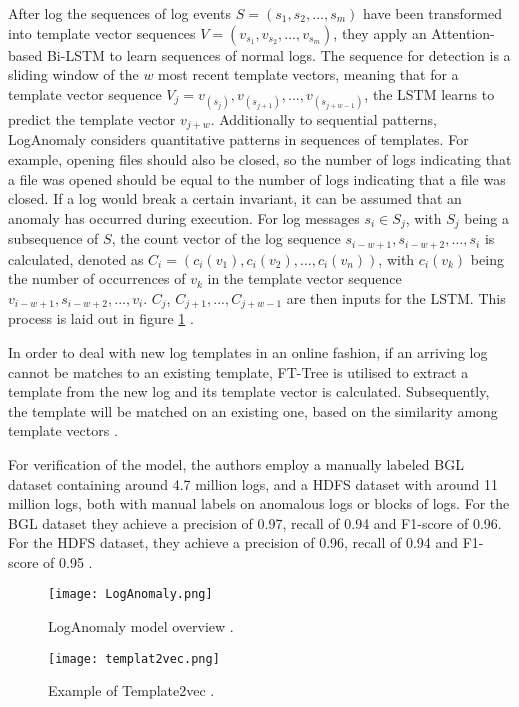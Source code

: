 After log the sequences of log events $S=(s_1, s_2,...,s_m)$ have been transformed into template vector sequences $V=(v_{s_1}, v_{s_2},...,v_{s_m})$, they apply an Attention-based Bi-LSTM to learn sequences of normal logs. The sequence for detection is a sliding window of the $w$ most recent template vectors, meaning that for a template vector sequence $V_j = v_{(s_j)}, v_{(s_{j+1})}, ..., v_{(s_{j+w-1})}$, the LSTM learns to predict the template vector $v_{j+w}$. Additionally to sequential patterns, LogAnomaly considers quantitative patterns in sequences of templates. For example, opening files should also be closed, so the number of logs indicating that a file was opened should be equal to the number of logs indicating that a file was closed. If a log would break a certain invariant, it can be assumed that an anomaly has occurred during execution. For log messages $s_i \in S_j$, with $S_j$ being a subsequence of $S$, the count vector of the log sequence $s_{i-w+1},s_{i-w+2},...,s_i$ is calculated, denoted as $C_i = (c_i(v_1), c_i(v_2), ..., c_i(v_n))$, with $c_i(v_k)$ being the number of occurrences of $v_k$ in the template vector sequence $v_{i-w+1},s_{i-w+2},...,v_i$. $C_j$, $C_{j+1}, ..., C_{j+w-1}$ are then inputs for the LSTM. This process is laid out in figure \ref{fig:loganomaly} \cite{meng2019loganomaly}.

In order to deal with new log templates in an online fashion, if an arriving log cannot be matches to an existing template, FT-Tree is utilised to extract a template from the new log and its template vector is calculated. Subsequently, the template will be matched on an existing one, based on the similarity among template vectors \cite{meng2019loganomaly}.

For verification of the model, the authors employ a manually labeled BGL dataset containing around 4.7 million logs, and a HDFS dataset with around 11 million logs, both with manual labels on anomalous logs or blocks of logs. For the BGL dataset they achieve a precision of 0.97, recall of 0.94 and F1-score of 0.96. For the HDFS dataset, they achieve a precision of 0.96, recall of 0.94 and F1-score of 0.95 \cite{meng2019loganomaly}.

\begin{figure}[h]
  \centering
  \texttt{[image: LogAnomaly.png]}\\
  \caption{LogAnomaly model overview \cite{meng2019loganomaly}.}
  \label{fig:loganomaly}
\end{figure}

\begin{figure}[h]
  \centering
  \texttt{[image: templat2vec.png]}\\
  \caption{Example of Template2vec \cite{meng2019loganomaly}.}
  \label{fig:template2vec}
\end{figure}


